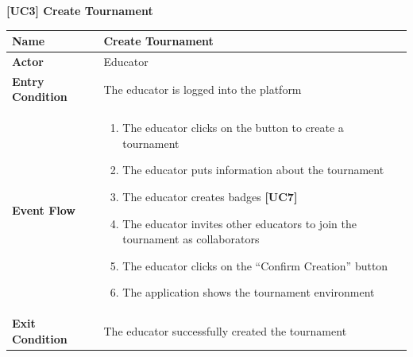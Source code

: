 \documentclass{article}
\begin{document}
\begin{table}
 \renewcommand{\arraystretch}{1.5}
    \centering
    \raggedright\textbf{[UC3] Create Tournament}
    \begin{tabular}{|l|p{10cm}|}
        \hline
        \textbf{Name} & Create Tournament \\
        \hline
        \textbf{Actor} & Educator \\
        \hline
        \textbf{Entry Condition} & The educator is logged into the platform \\
        \hline
        \textbf{Event Flow} & 
        \begin{enumerate}[align=left, topsep=0pt, partopsep=0pt]
            \item The educator clicks on the button to create a tournament
            \item The educator puts information about the tournament 
            \item The educator creates badges \textbf{[UC7]}
            \item The educator invites other educators to join the tournament as collaborators
            \item The educator clicks on the “Confirm Creation” button
            \item The application shows the tournament environment 
        \end{enumerate} \\
        \hline
        \textbf{Exit Condition} & The educator successfully created the tournament  \\
        \hline
    \end{tabular}
\end{table}
\end{document}
